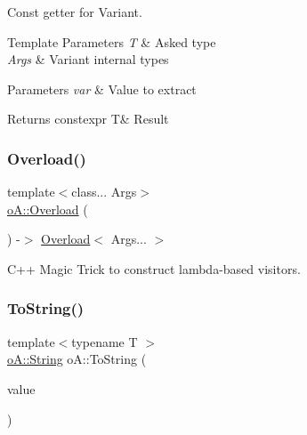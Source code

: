 Const getter for Variant. 


\begin{DoxyTemplParams}{Template Parameters}
{\em T} & Asked type \\
\hline
{\em Args} & Variant internal types \\
\hline
\end{DoxyTemplParams}

\begin{DoxyParams}{Parameters}
{\em var} & Value to extract \\
\hline
\end{DoxyParams}
\begin{DoxyReturn}{Returns}
constexpr T\& Result 
\end{DoxyReturn}
\mbox{\label{namespaceo_a_a503e8d88dbf13dedc19801dafc632979}} 
\subsubsection{\texorpdfstring{Overload()}{Overload()}}
{\footnotesize\ttfamily template$<$class... Args$>$ \\
\mbox{\hyperlink{structo_a_1_1_overload}{o\+A\+::\+Overload}} (\begin{DoxyParamCaption}\item[{Args...}]{ }\end{DoxyParamCaption}) -\/$>$  \mbox{\hyperlink{structo_a_1_1_overload}{Overload}}$<$ Args... $>$}



C++ Magic Trick to construct lambda-\/based visitors. 

\mbox{\label{namespaceo_a_ab2db5fe904e4be44ffb651930b97d482}} 
\subsubsection{\texorpdfstring{To\+String()}{ToString()}}
{\footnotesize\ttfamily template$<$typename T $>$ \\
\mbox{\hyperlink{classo_a_1_1_string}{o\+A\+::\+String}} o\+A\+::\+To\+String (\begin{DoxyParamCaption}\item[{T}]{value }\end{DoxyParamCaption})}



